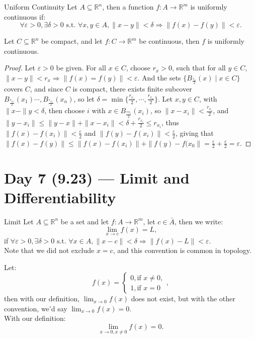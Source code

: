 \documentclass[11pt]{article}
\newenvironment{definition}[1]{\begin{defbox}{#1}{}}{\end{defbox}}
\newenvironment{theorem}[1]{\begin{thmbox}{#1}{}}{\end{thmbox}}
\newenvironment{example}[1]{\begin{exbox}{#1}{}}{\end{exbox}}
\theoremstyle{quiet}
\theoremstyle{quietremark}
\begin{document}
\begin{definition}{Uniform Continuity}
Let $A\subseteq\mathbb{R}^n$, then a function $f:A\to\mathbb{R}^m$ is uniformly continuous if:
\[
\forall\varepsilon>0,\exists\delta>0 \text{ s.t. }\forall x,y\in A, \|x-y\|<\delta\Rightarrow\|f(x)-f(y)\|<\varepsilon.
\]
\end{definition}

\begin{theorem}{}
Let $C\subseteq\mathbb{R}^n$ be compact, and let $f:C\to\mathbb{R}^m$ be continuous, then $f$ is uniformly continuous.
\end{theorem}

\begin{proof}
Let $\varepsilon>0$ be given. For all $x\in C$, choose $r_x>0$, such that for all $y\in C$, $\|x-y\|<r_x\Rightarrow \|f(x)=f(y)\|<\varepsilon$. And the sets $\{B_{\frac{r_x}{2}}(x)\mid x\in C\}$ covers $C$, and since $C$ is compact, there exists finite subcover $B_\frac{r_{x_1}}{2}(x_1)\cdots, B_\frac{r_{x_n}}{2}(x_n)$, so let $\delta=\min\{\frac{r_{x_1}}{2},\cdots,\frac{r_{x_n}}{2}\}$. Let $x,y\in C$, with $\|x-\|y<\delta$, then choose $i$ with $x\in B_\frac{r{x_i}}{2}(x_i)$, so $\|x-x_i\|<\frac{r_{x_i}}{2}$, and $\|y-x_i\|\le\|y-x\|+\|x-x_i\|<\delta+\frac{r_{x_i}}{2}\le r_{x_i}$, thus $\|f(x)-f(x_i)\|<\frac{\varepsilon}{2}$ and $\|f(y)-f(x_i)\|<\frac{\varepsilon}{2}$, giving that $\|f(x)-f(y)\|\le\|f(x)-f(x_i)\|+\|f(y)-f(x_0\|=\frac{\varepsilon}{2}+\frac{\varepsilon}{2}=\varepsilon$.
\end{proof}

\newpage
\section{Day 7 (9.23) --- Limit and Differentiability}
\begin{definition}{Limit}
Let $A\subseteq\mathbb{R}^n$ be a set and let $f:A\to\mathbb{R}^m$, let $c\in\bar A$, then we write:
\[
\lim_{x\to c}f(x)=L,
\]
if $\forall\varepsilon>0,\exists\delta>0\text{ s.t. }\forall x\in A,\|x-c\|<\delta\Rightarrow \|f(x)-L\|<\varepsilon.$\\
Note that we did not exclude $x=c$, and this convention is common in topology.
\end{definition}

\begin{example}{}
Let:
\[
f(x)=\begin{cases}0,\text{if } x\ne 0,\\1,\text{if } x=0\end{cases},
\]
then with our definition, $\lim_{x\to 0}f(x)$ does not exist, but with the other convention, we'd say $\lim_{x\to 0}f(x)=0$. \\
With our definition:
\[
\lim_{x\to 0,x\ne 0}f(x)=0.
\]
\end{example}
\end{document}

